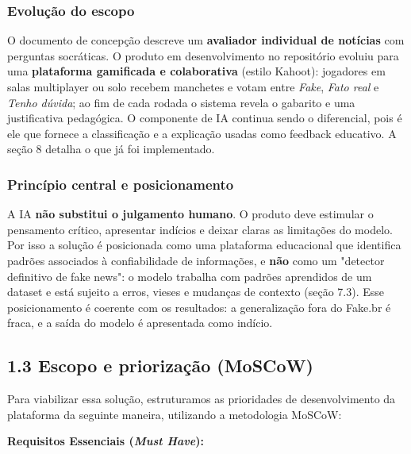 \documentclass[
  brazilian,
  11pt,
]{article}
\begin{document}
\subsubsection{Evolução do escopo}\label{evoluuxe7uxe3o-do-escopo}

O documento de concepção descreve um \textbf{avaliador individual de notícias} com perguntas socráticas. O produto em desenvolvimento no repositório evoluiu para uma \textbf{plataforma gamificada e colaborativa} (estilo Kahoot): jogadores em salas multiplayer ou solo recebem manchetes e votam entre \emph{Fake}, \emph{Fato real} e \emph{Tenho dúvida}; ao fim de cada rodada o sistema revela o gabarito e uma justificativa pedagógica. O componente de IA continua sendo o diferencial, pois é ele que fornece a classificação e a explicação usadas como feedback educativo. A seção 8 detalha o que já foi implementado.

\subsubsection{Princípio central e posicionamento}\label{princuxedpio-central-e-posicionamento}

A IA \textbf{não substitui o julgamento humano}. O produto deve estimular o pensamento crítico, apresentar indícios e deixar claras as limitações do modelo. Por isso a solução é posicionada como uma plataforma educacional que identifica padrões associados à confiabilidade de informações, e \textbf{não} como um "detector definitivo de fake news": o modelo trabalha com padrões aprendidos de um dataset e está sujeito a erros, vieses e mudanças de contexto (seção 7.3). Esse posicionamento é coerente com os resultados: a generalização fora do Fake.br é fraca, e a saída do modelo é apresentada como indício.

\subsection{1.3 Escopo e priorização (MoSCoW)}\label{escopo-e-priorizauxe7uxe3o-moscow}

Para viabilizar essa solução, estruturamos as prioridades de desenvolvimento da plataforma da seguinte maneira, utilizando a metodologia MoSCoW:

\textbf{Requisitos Essenciais (\emph{Must Have}):}
\end{document}
